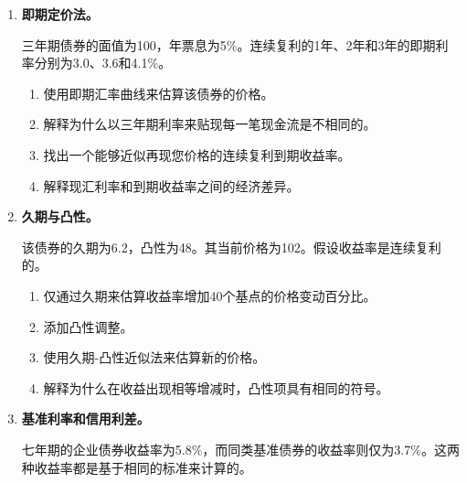 \begin{enumerate}
\begin{enumerate}
\item 请确定在每种情况下，该债券是以溢价还是折价进行交易的。

\item 请确认价格变动的方向与价格与收益率之间的关系是一致的。

\end{enumerate}

\item \textbf{即期定价法。}

三年期债券的面值为100，年票息为5\%。连续复利的1年、2年和3年的即期利率分别为3.0、3.6和4.1\%。

\begin{enumerate}

\item 使用即期汇率曲线来估算该债券的价格。

\item 解释为什么以三年期利率来贴现每一笔现金流是不相同的。

\item 找出一个能够近似再现您价格的连续复利到期收益率。

\item 解释现汇利率和到期收益率之间的经济差异。

\end{enumerate}

\item \textbf{久期与凸性。}

该债券的久期为6.2，凸性为48。其当前价格为102。假设收益率是连续复利的。

\begin{enumerate}

\item 仅通过久期来估算收益率增加40个基点的价格变动百分比。

\item 添加凸性调整。

\item 使用久期-凸性近似法来估算新的价格。

\item 解释为什么在收益出现相等增减时，凸性项具有相同的符号。

\end{enumerate}

\item \textbf{基准利率和信用利差。}

七年期的企业债券收益率为5.8\%，而同类基准债券的收益率则仅为3.7\%。这两种收益率都是基于相同的标准来计算的。

\begin{enumerate}


\end{enumerate}
\end{enumerate}
